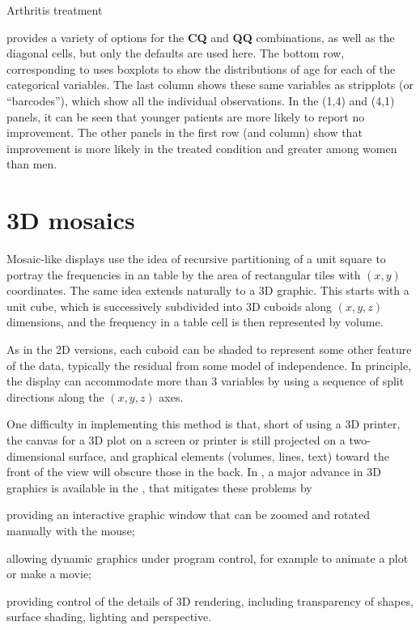 \documentclass[11pt]{book}\usepackage[]{graphicx}\usepackage[]{color}
\newenvironment{knitrout}{}{} %
\renewenvironment{knitrout}{\small\renewcommand{\baselinestretch}{.85}}{} %
\begin{document}
\begin{Example}{Arthritis treatment}
\begin{knitrout}
\end{knitrout}


 provides a variety of options for the \textbf{CQ} and \textbf{QQ}
combinations, as well as the diagonal cells,
but only the defaults are used here.  The bottom row, corresponding to 
uses boxplots to show the distributions of age for each of the categorical variables.
The last column shows these same variables as stripplots (or ``barcodes''),
which show all the individual observations.  In the (1,4) and (4,1) panels, it can
be seen that younger patients are more likely to report no improvement.
The other panels in the first row (and column) show that improvement is more
likely in the treated condition and greater among women than men.  
\end{Example}

\section{3D mosaics}\label{sec:3D}

Mosaic-like displays use the idea of recursive partitioning of a unit square to
portray the frequencies in an \nway table by the area of rectangular tiles
with $(x, y)$ coordinates.
The same idea extends naturally to a 3D graphic.  This starts with a unit cube,
which is successively subdivided into 3D cuboids along $(x, y, z)$ dimensions,
and the frequency in a table cell is then represented by volume.

As in the 2D versions, each cuboid can be shaded to represent some other
feature of the data, typically the residual from some model of independence.
In principle, the display can accommodate more than 3 variables by
using a sequence of split directions along the $(x, y, z)$ axes.

One difficulty in implementing this method is that, short of using a 3D printer,
the canvas for a 3D plot on a screen or printer is still projected 
on a two-dimensional surface, and graphical elements (volumes, lines, text)
toward the front of the view will obscure those in the back.
In \R, a major advance in 3D graphics is available in the ,
that mitigates these problems by
\begin{seriate}
 \item providing an interactive graphic window that can be zoomed and rotated
 manually with the mouse;
 \item allowing dynamic graphics under program control, for example to animate
 a plot or make a movie;
 \item providing control of the details of 3D rendering, including transparency
 of shapes, surface shading, lighting and perspective.
\end{seriate}
\end{document}
